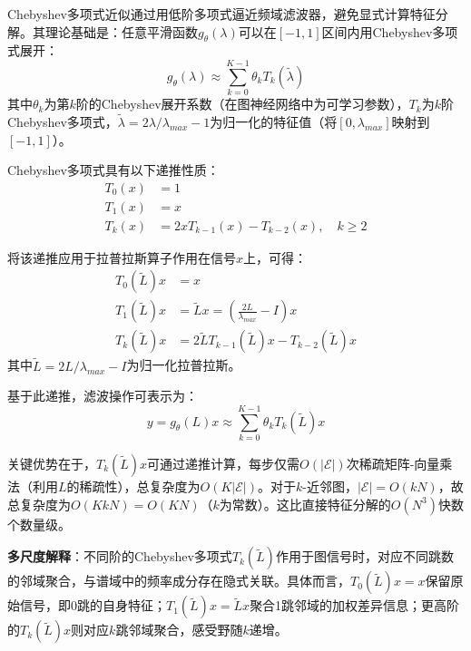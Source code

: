 \documentclass[12pt,a4paper,openany,oneside]{ctexbook}
\theoremstyle{definition}
\theoremstyle{remark}
\begin{document}
Chebyshev多项式近似\cite{defferrard2016convolutional,hammond2011wavelets}通过用低阶多项式逼近频域滤波器，避免显式计算特征分解。其理论基础是：任意平滑函数$g_\theta(\lambda)$可以在$[-1,1]$区间内用Chebyshev多项式展开：
\begin{equation}
g_\theta(\lambda) \approx \sum_{k=0}^{K-1} \theta_k T_k(\tilde{\lambda})
\end{equation}
其中$\theta_k$为第$k$阶的Chebyshev展开系数（在图神经网络中为可学习参数），$T_k$为$k$阶Chebyshev多项式，$\tilde{\lambda} = 2\lambda/\lambda_{max} - 1$为归一化的特征值（将$[0, \lambda_{max}]$映射到$[-1,1]$）。

Chebyshev多项式具有以下递推性质：
\begin{equation}
\begin{aligned}
T_0(x) &= 1 \\
T_1(x) &= x \\
T_k(x) &= 2xT_{k-1}(x) - T_{k-2}(x), \quad k \geq 2
\end{aligned}
\end{equation}

将该递推应用于拉普拉斯算子作用在信号$x$上，可得：
\begin{equation}
\begin{aligned}
T_0(\tilde{L})x &= x \\
T_1(\tilde{L})x &= \tilde{L}x = \left(\frac{2L}{\lambda_{max}} - I\right)x \\
T_k(\tilde{L})x &= 2\tilde{L}T_{k-1}(\tilde{L})x - T_{k-2}(\tilde{L})x
\end{aligned}
\end{equation}
其中$\tilde{L} = 2L/\lambda_{max} - I$为归一化拉普拉斯。

基于此递推，滤波操作可表示为：
\begin{equation}
y = g_\theta(L)x \approx \sum_{k=0}^{K-1} \theta_k T_k(\tilde{L})x
\end{equation}

关键优势在于，$T_k(\tilde{L})x$可通过递推计算，每步仅需$O(|\mathcal{E}|)$次稀疏矩阵-向量乘法（利用$L$的稀疏性），总复杂度为$O(K|\mathcal{E}|)$。对于$k$-近邻图，$|\mathcal{E}| = O(kN)$，故总复杂度为$O(KkN) = O(KN)$（$k$为常数）。这比直接特征分解的$O(N^3)$快数个数量级。

\textbf{多尺度解释}：不同阶的Chebyshev多项式$T_k(\tilde{L})$作用于图信号时，对应不同跳数的邻域聚合，与谱域中的频率成分存在隐式关联。具体而言，$T_0(\tilde{L})x = x$保留原始信号，即0跳的自身特征；$T_1(\tilde{L})x = \tilde{L}x$聚合1跳邻域的加权差异信息；更高阶的$T_k(\tilde{L})x$则对应$k$跳邻域聚合，感受野随$k$递增。
\end{document}
